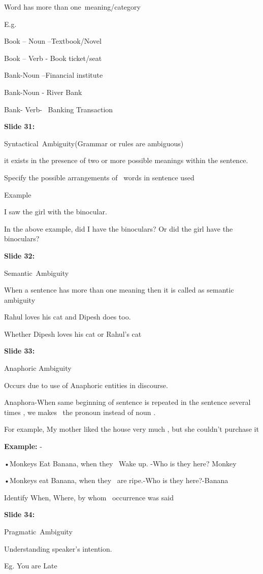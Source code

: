 \documentclass[11pt,a4paper]{article}
\begin{document}
Word has more than one meaning/category

E.g.

Book – Noun –Textbook/Novel

Book – Verb - Book ticket/seat

Bank-Noun –Financial institute

Bank-Noun - River Bank

Bank- Verb-  Banking Transaction

\textbf{Slide 31:}

Syntactical Ambiguity(Grammar or rules are ambiguous)

it exists in the presence of two or more possible meanings within the sentence.

Specify the possible arrangements of  words in sentence used

Example

I saw the girl with the binocular.

In the above example, did I have the binoculars? Or did the girl have the binoculars?

\textbf{Slide 32:}

Semantic Ambiguity

When a sentence has more than one meaning then it is called as semantic ambiguity

Rahul loves his cat and Dipesh does too.

Whether Dipesh loves his cat or Rahul's cat

\textbf{Slide 33:}

Anaphoric Ambiguity

Occurs due to use of Anaphoric entities in discourse.

Anaphora-When same beginning of sentence is repeated in the sentence several times , we makes  the pronoun instead of noun .

For example, My mother liked the house very much , but she couldn't purchase it

\textbf{Example:} -

•Monkeys Eat Banana, when they  Wake up. -Who is they here? Monkey

•Monkeys eat Banana, when they  are ripe.-Who is they here?-Banana

Identify When, Where, by whom  occurrence was said

\textbf{Slide 34:}

Pragmatic Ambiguity

Understanding speaker's intention.

Eg. You are Late
\end{document}
